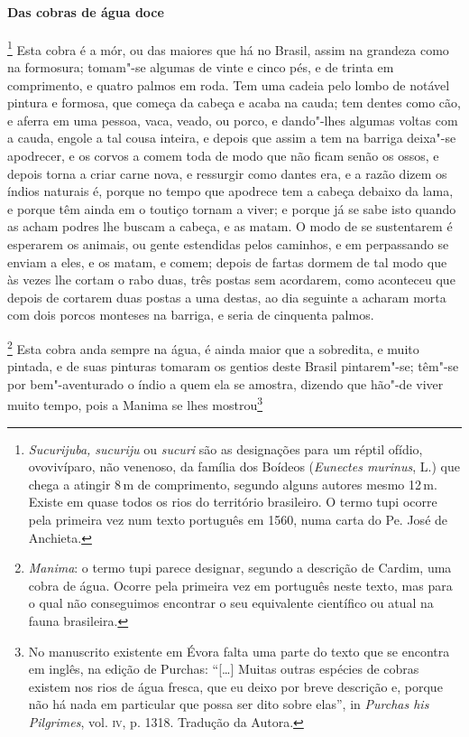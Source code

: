 \begin{linenumbers}
\paragraph{Das cobras de água doce}\quad
{}\footnote{ \textit{Sucurijuba, sucuriju}
ou \textit{sucuri} são as designações para um réptil ofídio,
ovovivíparo, não venenoso, da família dos Boídeos (\textit{Eunectes
murinus}, L.) que chega a atingir 8\,m de comprimento, segundo alguns
autores mesmo 12\,m. Existe em quase todos os rios do território
brasileiro. O termo tupi ocorre pela primeira vez num texto português
em 1560, numa carta do Pe. José de Anchieta.} Esta
cobra é a mór, ou das maiores que há no Brasil, assim na grandeza como
na formosura; tomam"-se algumas de vinte e cinco pés, e de trinta em
comprimento, e quatro palmos em roda. Tem uma cadeia pelo lombo de
notável pintura e formosa, que começa da cabeça e acaba na cauda; tem
dentes como cão, e aferra em uma pessoa, vaca, veado, ou porco, e
dando"-lhes algumas voltas com a cauda, engole a tal cousa inteira, e
depois que assim a tem na barriga deixa"-se apodrecer, e os corvos a
comem toda de modo que não ficam senão os ossos, e depois torna a criar
carne nova, e ressurgir como dantes era, e a razão dizem os índios
naturais é, porque no tempo que apodrece tem a cabeça debaixo da lama,
e porque têm ainda em o toutiço tornam a viver; e porque já se sabe
isto quando as acham podres lhe buscam a cabeça, e as matam. O modo de
se sustentarem é esperarem os animais, ou gente estendidas pelos
caminhos, e em perpassando se enviam a eles, e os matam, e comem;
depois de fartas dormem de tal modo que às vezes lhe cortam o rabo
duas, três postas sem acordarem, como aconteceu que depois de cortarem
duas postas a uma destas, ao dia seguinte a acharam morta com dois
porcos monteses na barriga, e seria de cinquenta palmos.

\footnote{ \textit{Manima}: o termo tupi parece
designar, segundo a descrição de Cardim, uma cobra de água. Ocorre pela
primeira vez em português neste texto, mas para o qual não conseguimos
encontrar o seu equivalente científico ou atual na fauna
brasileira.} Esta cobra anda sempre na água, é ainda maior
que a sobredita, e muito pintada, e de suas pinturas tomaram os gentios
deste Brasil pintarem"-se; têm"-se por bem"-aventurado o índio a quem ela
se amostra, dizendo que hão"-de viver muito tempo, pois a Manima se lhes
mostrou\footnote{ No manuscrito existente em Évora falta uma parte
do texto que se encontra em inglês, na edição de Purchas: ``[\ldots{}] 
Muitas outras espécies de cobras existem nos rios de água fresca, que
eu deixo por breve descrição e, porque não há nada em particular que
possa ser dito sobre elas'', in \textit{Purchas his Pilgrimes}, vol.
\textsc{iv}, p. 1318. Tradução da Autora.} 



\end{linenumbers}
